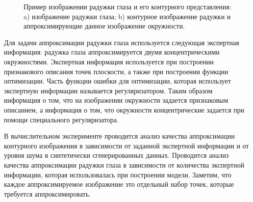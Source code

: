 \documentclass[12pt, twoside]{article}
\numberwithin{equation}{section}
\begin{document}
\begin{figure}
\begin{subfigure}[b]{0.3\textwidth}
         \caption{}
         \label{intro:fig1:outer}
     \end{subfigure}
     \caption{Пример изображении радужки глаза и его контурного представления: a) изображение радужки глаза; b) контурное изображение радужки и аппроксимирующие данное изображение окружности.}
    \label{intro:fig1}
\end{figure}

Для задачи аппроксимации радужки глаза используется следующая экспертная информация: радужка глаза аппроксимируется двумя концентрическими окружностями. Экспертная информация используется при построении признакового описания точек плоскости, а также при построении функции оптимизации. Часть функции ошибки для оптимизации, которая использует экспертную информации называется регуляризатором. Таким образом информация о том, что на изображении окружности задается признаковым описанием, а информация о том, что окружности концентрические задается при помощи специального регуляризатора.

В вычислительном эксперименте проводится анализ качества аппроксимации контурного изображения в зависимости от заданной экспертной информации и от уровня шума в синтетически сгенерированных данных. Проводится анализ качества аппроксимации радужки глаза в зависимости от количества экспертной информации, которая использовалась при построении модели. Заметим, что каждое аппроксимируемое изображение это отдельный набор точек, которые требуется аппроксимировать.
\end{document}
